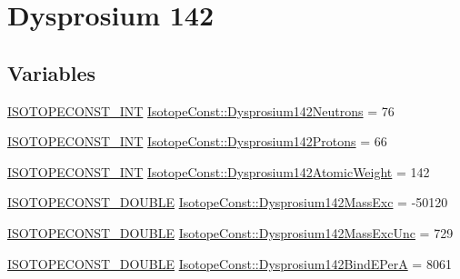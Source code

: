\hypertarget{group___isotope_const-_dysprosium-_dy142}{}\section{Dysprosium 142}
\label{group___isotope_const-_dysprosium-_dy142}
\subsection*{Variables}
\begin{DoxyCompactItemize}
\item 
\mbox{\hyperlink{group___isotope_const-_macros_ga5f18360b3e99483a35c32d789e62621c}{I\+S\+O\+T\+O\+P\+E\+C\+O\+N\+S\+T\+\_\+\+I\+NT}} \mbox{\hyperlink{group___isotope_const-_dysprosium-_dy142_ga20d0b55a78c397ed527c672c34c6a43c}{Isotope\+Const\+::\+Dysprosium142\+Neutrons}} = 76
\item 
\mbox{\hyperlink{group___isotope_const-_macros_ga5f18360b3e99483a35c32d789e62621c}{I\+S\+O\+T\+O\+P\+E\+C\+O\+N\+S\+T\+\_\+\+I\+NT}} \mbox{\hyperlink{group___isotope_const-_dysprosium-_dy142_gad5f4d7544ee65a28f4c4e814821981a5}{Isotope\+Const\+::\+Dysprosium142\+Protons}} = 66
\item 
\mbox{\hyperlink{group___isotope_const-_macros_ga5f18360b3e99483a35c32d789e62621c}{I\+S\+O\+T\+O\+P\+E\+C\+O\+N\+S\+T\+\_\+\+I\+NT}} \mbox{\hyperlink{group___isotope_const-_dysprosium-_dy142_gabd4f817f3af9dd5185118dd95164c5a3}{Isotope\+Const\+::\+Dysprosium142\+Atomic\+Weight}} = 142
\item 
\mbox{\hyperlink{group___isotope_const-_macros_ga8f45a7272ce02c0b4c65c44636ed719a}{I\+S\+O\+T\+O\+P\+E\+C\+O\+N\+S\+T\+\_\+\+D\+O\+U\+B\+LE}} \mbox{\hyperlink{group___isotope_const-_dysprosium-_dy142_ga03d850d7495bb4a03480792cb7542bfd}{Isotope\+Const\+::\+Dysprosium142\+Mass\+Exc}} = -\/50120
\item 
\mbox{\hyperlink{group___isotope_const-_macros_ga8f45a7272ce02c0b4c65c44636ed719a}{I\+S\+O\+T\+O\+P\+E\+C\+O\+N\+S\+T\+\_\+\+D\+O\+U\+B\+LE}} \mbox{\hyperlink{group___isotope_const-_dysprosium-_dy142_gaaed5cee300f5274f0c0a5ece97149e76}{Isotope\+Const\+::\+Dysprosium142\+Mass\+Exc\+Unc}} = 729
\item 
\mbox{\hyperlink{group___isotope_const-_macros_ga8f45a7272ce02c0b4c65c44636ed719a}{I\+S\+O\+T\+O\+P\+E\+C\+O\+N\+S\+T\+\_\+\+D\+O\+U\+B\+LE}} \mbox{\hyperlink{group___isotope_const-_dysprosium-_dy142_ga7f0b39e1bc7f7d8500b61ec427c2a9cd}{Isotope\+Const\+::\+Dysprosium142\+Bind\+E\+PerA}} = 8061
\item 

\end{DoxyCompactItemize}

